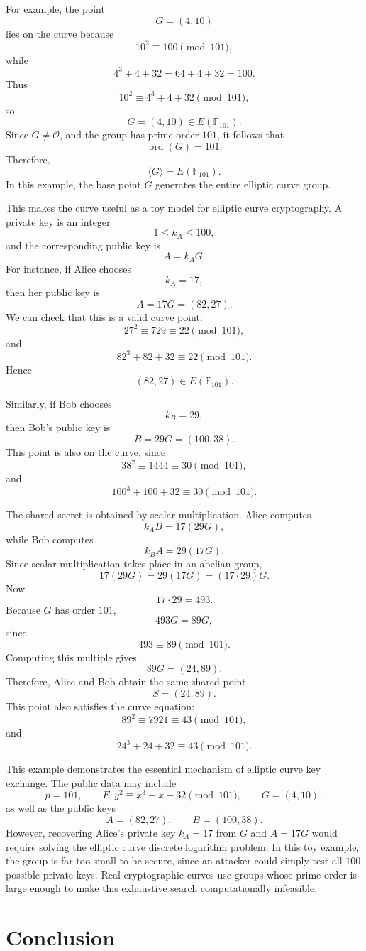 \documentclass[12pt,a4paper]{article}
\begin{document}
For example, the point
\[G=(4,10)\]
lies on the curve because
\[10^2\equiv 100\pmod {101},\]
while
\[4^3+4+32=64+4+32=100.\]
Thus
\[10^2\equiv 4^3+4+32\pmod {101},\]
so
\[G=(4,10)\in E(\mathbb{F}_{101}).\]
Since \(G\neq\mathcal{O}\), and the group has prime order \(101\), it follows that
\[\operatorname{ord}(G)=101.\]
Therefore,
\[\langle G\rangle=E(\mathbb{F}_{101}).\]
In this example, the base point \(G\) generates the entire elliptic curve group.

This makes the curve useful as a toy model for elliptic curve cryptography. A private key is an integer
\[1\leq k_A\leq 100,\]
and the corresponding public key is
\[A=k_AG.\]
For instance, if Alice chooses
\[k_A=17,\]
then her public key is
\[A=17G=(82,27).\]
We can check that this is a valid curve point:
\[27^2\equiv 729\equiv 22\pmod {101},\]
and
\[82^3+82+32\equiv 22\pmod {101}.\]
Hence
\[(82,27)\in E(\mathbb{F}_{101}).\]

Similarly, if Bob chooses
\[k_B=29,\]
then Bob's public key is
\[B=29G=(100,38).\]
This point is also on the curve, since
\[38^2\equiv 1444\equiv 30\pmod {101},\]
and
\[100^3+100+32\equiv 30\pmod {101}.\]

The shared secret is obtained by scalar multiplication. Alice computes
\[k_AB=17(29G),\]
while Bob computes
\[k_BA=29(17G).\]
Since scalar multiplication takes place in an abelian group,
\[17(29G)=29(17G)=(17\cdot 29)G.\]
Now
\[17\cdot 29=493.\]
Because \(G\) has order \(101\), 
\[493G=89G,\]
since
\[493\equiv 89\pmod {101}.\]
Computing this multiple gives
\[89G=(24,89).\]
Therefore, Alice and Bob obtain the same shared point
\[S=(24,89).\]
This point also satisfies the curve equation:
\[89^2\equiv 7921\equiv 43\pmod {101},\]
and
\[24^3+24+32\equiv 43\pmod {101}.\]

This example demonstrates the essential mechanism of elliptic curve key exchange. The public data may include
\[p=101,\qquad E:y^2\equiv x^3+x+32\pmod {101},\qquad G=(4,10),\]
as well as the public keys
\[A=(82,27),\qquad B=(100,38).\]
However, recovering Alice's private key \(k_A=17\) from \(G\) and \(A=17G\) would require solving the elliptic curve discrete logarithm problem. In this toy example, the group is far too small to be secure, since an attacker could simply test all \(100\) possible private keys. Real cryptographic curves use groups whose prime order is large enough to make this exhaustive search computationally infeasible.

\section{Conclusion}
\end{document}

